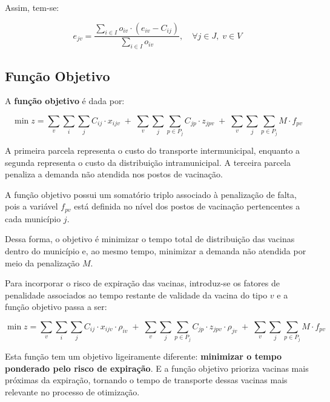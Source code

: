 Assim, tem-se:

\begin{equation*}
e_{jv} =
\frac{
\sum\limits_{i \in I} o_{iv} \cdot \left( e_{iv} - C_{ij} \right)
}{
\sum\limits_{i \in I} o_{iv}
},
\quad \forall j \in J,\; v \in V
\end{equation*}


\subsection{Função Objetivo}

A \textbf{função objetivo} é dada por:

\begin{equation}
\min z = 
\sum_{v} \sum_{i} \sum_{j} C_{ij} \cdot x_{ijv}
\;+\;
\sum_{v} \sum_{j} \sum_{p \in P_j} C_{jp} \cdot z_{jpv}
\;+\;
\sum_{v} \sum_{j} \sum_{p \in P_j} M \cdot f_{pv}
\label{modelo_sem_intermediacao_sem_penalidade}
\end{equation}

A primeira parcela representa o custo do transporte intermunicipal, enquanto a segunda representa o custo da distribuição intramunicipal. A terceira parcela penaliza a demanda não atendida nos postos de vacinação.

A função objetivo possui um somatório triplo associado à penalização de falta, pois a variável $f_{pv}$ está definida no nível dos postos de vacinação pertencentes a cada município $j$.

Dessa forma, o objetivo é minimizar o tempo total de distribuição das vacinas dentro do município e, ao mesmo tempo, minimizar a demanda não atendida por meio da penalização $M$.

Para incorporar o risco de expiração das vacinas, introduz-se os fatores de penalidade associados ao tempo restante de validade da vacina do tipo $v$ e a função objetivo passa a ser:

\begin{equation}
\min z = 
\sum_{v} \sum_{i} \sum_{j} C_{ij} \cdot x_{ijv} \cdot \rho_{iv}
\;+\;
\sum_{v} \sum_{j} \sum_{p \in P_j} C_{jp} \cdot z_{jpv} \cdot \rho_{jv}
\;+\;
\sum_{v} \sum_{j} \sum_{p \in P_j} M \cdot f_{pv}
\label{modelo_sem_intermediacao_com_penalidade}
\end{equation}

Esta função tem um objetivo ligeiramente diferente: \textbf{minimizar o tempo ponderado pelo risco de expiração}. E a função objetivo prioriza vacinas mais próximas da expiração, tornando o tempo de transporte dessas vacinas mais relevante no processo de otimização.


